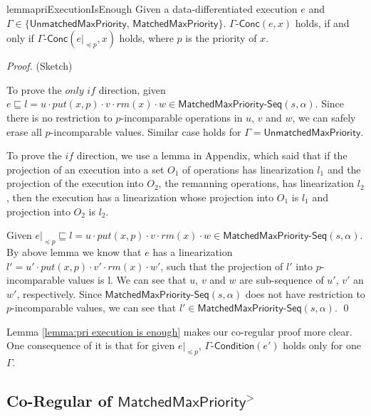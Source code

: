 \begin{restatable}{lemma}{priExecutionIsEnough}
\label{lemma:pri execution is enough}
Given a data-differentiated execution $e$ and $\Gamma\in \{\mathsf{UnmatchedMaxPriority}$, $\mathsf{MatchedMaxPriority}\}$. $\Gamma\mathsf{\text{-}Conc}(e,x)$ holds, if and only if $\Gamma\mathsf{\text{-}Conc}(e\vert_{\preceq p},x)$ holds, where $p$ is the priority of $x$.
\end{restatable}
\begin {proof} (Sketch)

To prove the $\textit{only if}$ direction, given $e \sqsubseteq l = u \cdot \textit{put}(x,p) \cdot v \cdot \textit{rm}(x) \cdot w \in \mathsf{MatchedMaxPriority}\mathsf{\text{-}Seq}(s,\alpha)$. Since there is no restriction to $p$-incomparable operations in $u$, $v$ and $w$, we can safely erase all $p$-incomparable values. Similar case holds for $\Gamma=\mathsf{UnmatchedMaxPriority}$. 

To prove the $\textit{if}$ direction, we use a lemma in Appendix, which said that if the projection of an execution into a set $O_1$ of operations has linearization $l_1$ and the projection of the execution into $O_2$, the remanning operations, has linearization $l_2$, then the execution has a linearization whose projection into $O_1$ is $l_1$ and projection into $O_2$ is $l_2$.

Given $e\vert_{\preceq p} \sqsubseteq l = u \cdot \textit{put}(x,p) \cdot v \cdot \textit{rm}(x) \cdot w \in \mathsf{MatchedMaxPriority}\mathsf{\text{-}Seq}(s,\alpha)$. By above lemma we know that $e$ has a linearization $l' = u' \cdot \textit{put}(x,p) \cdot v' \cdot \textit{rm}(x) \cdot w'$, such that the projection of $l'$ into $p$-incomparable values is l. We can see that $u$, $v$ and $w$ are sub-sequence of $u'$, $v'$ an $w'$, respectively. Since $\mathsf{MatchedMaxPriority}\mathsf{\text{-}Seq}(s,\alpha)$ does not have restriction to $p$-incomparable values, we can see that $l' \in \mathsf{MatchedMaxPriority}\mathsf{\text{-}Seq}(s,\alpha)$. \qed
\end {proof}

Lemma \ref{lemma:pri execution is enough} makes our co-regular proof more clear. One consequence of it is that for given $e\vert_{\preceq p}$, $\Gamma\mathsf{\text{-}Condition}(e')$ holds only for one $\Gamma$. 






\subsection{Co-Regular of $\mathsf{MatchedMaxPriority}^{>}$}
\label{subsec:co-regular of EPQ1Lar}

